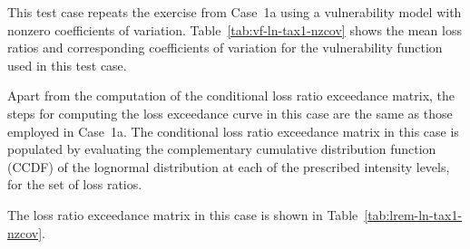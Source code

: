 This test case repeats the exercise from Case~1a using a vulnerability model with nonzero coefficients of variation. Table~\ref{tab:vf-ln-tax1-nzcov} shows the mean loss ratios and corresponding coefficients of variation for the vulnerability function used in this test case.

Apart from the computation of the conditional loss ratio exceedance matrix, the steps for computing the loss exceedance curve in this case are the same as those employed in Case~1a. The conditional loss ratio exceedance matrix in this case is populated by evaluating the complementary cumulative distribution function (CCDF) of the lognormal distribution at each of the prescribed intensity levels, for the set of loss ratios.



The loss ratio exceedance matrix in this case is shown in Table~\ref{tab:lrem-ln-tax1-nzcov}.